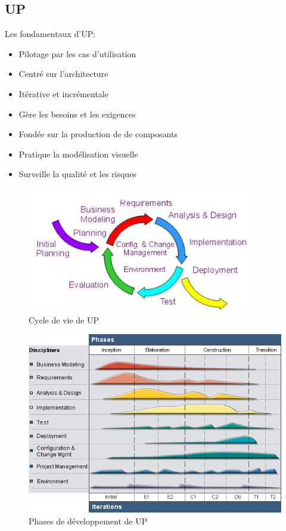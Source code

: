 	\subsection{UP}
		Les fondamentaux d'UP: 
		\begin{itemize}
			\item Pilotage par les cas d'utilisation
			\item Centré sur l'architecture
			\item Itérative et incrémentale
			\item Gère les besoins et les exigences
			\item Fondée sur la production de de composants 
			\item Pratique la modélisation visuelle
			\item Surveille la qualité et les risques
		\end{itemize}
		\vspace{3cm}
		\begin{figure}[H]
			\center
			\includegraphics[width=10cm]{images/2-up.jpg}
			\caption{Cycle de vie de UP}
		\end{figure}
		\begin{figure}[H]
			\center
			\includegraphics[width=14cm]{images/3-up.jpg}
			\caption{Phases de développement de UP}
		\end{figure}
